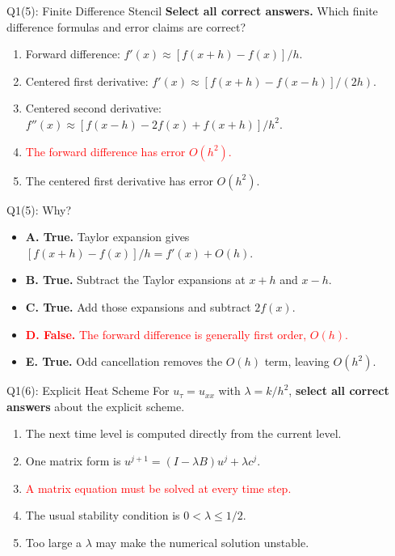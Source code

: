\documentclass{beamer}
\newcommand{\wrong}[1]{\textcolor{red}{#1}}
\begin{document}
\begin{frame}{Q1(5): Finite Difference Stencil}
\small
\textbf{Select all correct answers.} Which finite difference
formulas and error claims are correct?
\begin{enumerate}
\item[A.] Forward difference:
$f'(x)\approx[f(x+h)-f(x)]/h$.
\item[B.] Centered first derivative:
$f'(x)\approx[f(x+h)-f(x-h)]/(2h)$.
\item[C.] Centered second derivative:
$f''(x)\approx[f(x-h)-2f(x)+f(x+h)]/h^2$.
\item[\wrong{D.}] \wrong{The forward difference has error $O(h^2)$.}
\item[E.] The centered first derivative has error $O(h^2)$.
\end{enumerate}
\end{frame}

\begin{frame}{Q1(5): Why?}
\small
\begin{itemize}
\item \textbf{A. True.} Taylor expansion gives
$[f(x+h)-f(x)]/h=f'(x)+O(h)$.
\item \textbf{B. True.} Subtract the Taylor expansions at
$x+h$ and $x-h$.
\item \textbf{C. True.} Add those expansions and subtract $2f(x)$.
\item \wrong{\textbf{D. False.} The forward difference is generally
first order, $O(h)$.}
\item \textbf{E. True.} Odd cancellation removes the $O(h)$ term,
leaving $O(h^2)$.
\end{itemize}
\end{frame}

\begin{frame}{Q1(6): Explicit Heat Scheme}
\small
For $u_\tau=u_{xx}$ with $\lambda=k/h^2$, \textbf{select all
correct answers} about the explicit scheme.
\begin{enumerate}
\item[A.] The next time level is computed directly from the current level.
\item[B.] One matrix form is
$u^{j+1}=(I-\lambda B)u^j+\lambda c^j$.
\item[\wrong{C.}] \wrong{A matrix equation must be solved at every
time step.}
\item[D.] The usual stability condition is $0<\lambda\leq1/2$.
\item[E.] Too large a $\lambda$ may make the numerical solution unstable.
\end{enumerate}
\end{frame}
\end{document}
